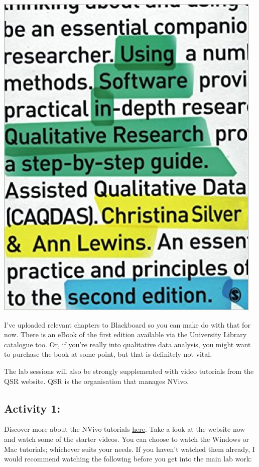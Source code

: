 \documentclass[
]{book}
\begin{document}
\includegraphics{imgs/qual_01.png}

I've uploaded relevant chapters to Blackboard so you can make do with that for now. There is an eBook of the first edition available via the University Library catalogue too. Or, if you're really into qualitative data analysis, you might want to purchase the book at some point, but that is definitely not vital.

The lab sessions will also be strongly supplemented with video tutorials from the QSR website. QSR is the organisation that manages NVivo.

\hypertarget{activity-1}{%
\subsection{Activity 1:}\label{activity-1}}

Discover more about the NVivo tutorials \href{https://www.qsrinternational.com/nvivo/free-nvivo-resources/tutorials}{here}. Take a look at the website now and watch some of the starter videos. You can choose to watch the Windows or Mac tutorials; whichever suits your needs. If you haven't watched them already, I would recommend watching the following before you get into the main lab work:
\end{document}
